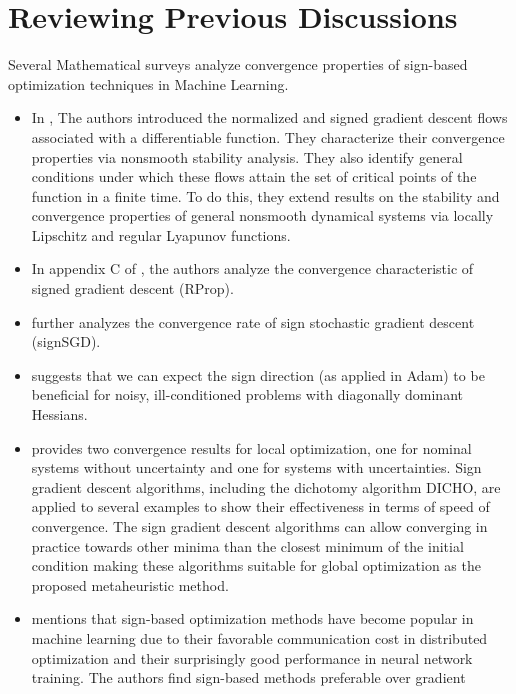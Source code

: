 \documentclass[11pt]{book}
\begin{document}
\chapter{Reviewing Previous Discussions}

Several Mathematical surveys analyze convergence properties of sign-based
optimization techniques in Machine Learning.

\begin{itemize}
\item In \cite{cortes2005achieving},
The authors introduced the normalized and signed gradient descent
flows associated with a differentiable function. They characterize
their convergence properties via nonsmooth stability analysis. They
also identify general conditions under which these flows attain the
set of critical points of the function in a finite time. To do this,
they extend results on the stability and convergence properties of
general nonsmooth dynamical systems via locally Lipschitz and regular
Lyapunov functions.
\item In appendix C of \cite{karimi2016linear},
the authors analyze the convergence characteristic of signed gradient
descent (RProp).
\item \cite{bernstein2018convergence}
further analyzes the convergence rate of sign stochastic gradient
descent (signSGD).
\item \cite{balles2018dissecting}
suggests that we can expect the sign direction (as applied in Adam)
to be beneficial for noisy, ill-conditioned problems with diagonally
dominant Hessians. 
\item \cite{moulay2019properties}
provides two convergence results for local optimization, one for nominal
systems without uncertainty and one for systems with uncertainties.
Sign gradient descent algorithms, including the dichotomy algorithm
DICHO, are applied to several examples to show their effectiveness
in terms of speed of convergence. The sign gradient descent algorithms
can allow converging in practice towards other minima than the closest
minimum of the initial condition making these algorithms suitable
for global optimization as the proposed metaheuristic method. 
\item \cite{balles2020geometry}
mentions that sign-based optimization methods have become popular
in machine learning due to their favorable communication cost in distributed
optimization and their surprisingly good performance in neural network
training. The authors find sign-based methods preferable over gradient

\end{itemize}
\end{document}
